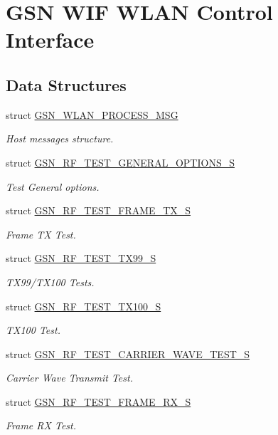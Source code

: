 \hypertarget{a00640}{
\section{GSN WIF WLAN Control Interface}
\label{a00640}
}
\subsection*{Data Structures}
\begin{DoxyCompactItemize}
\item 
struct \hyperlink{a00418}{GSN\_\-WLAN\_\-PROCESS\_\-MSG}
\begin{DoxyCompactList}\small\item\em Host messages structure. \end{DoxyCompactList}\item 
struct \hyperlink{a00188}{GSN\_\-RF\_\-TEST\_\-GENERAL\_\-OPTIONS\_\-S}
\begin{DoxyCompactList}\small\item\em Test General options. \end{DoxyCompactList}\item 
struct \hyperlink{a00187}{GSN\_\-RF\_\-TEST\_\-FRAME\_\-TX\_\-S}
\begin{DoxyCompactList}\small\item\em Frame TX Test. \end{DoxyCompactList}\item 
struct \hyperlink{a00190}{GSN\_\-RF\_\-TEST\_\-TX99\_\-S}
\begin{DoxyCompactList}\small\item\em TX99/TX100 Tests. \end{DoxyCompactList}\item 
struct \hyperlink{a00189}{GSN\_\-RF\_\-TEST\_\-TX100\_\-S}
\begin{DoxyCompactList}\small\item\em TX100 Test. \end{DoxyCompactList}\item 
struct \hyperlink{a00185}{GSN\_\-RF\_\-TEST\_\-CARRIER\_\-WAVE\_\-TEST\_\-S}
\begin{DoxyCompactList}\small\item\em Carrier Wave Transmit Test. \end{DoxyCompactList}\item 
struct \hyperlink{a00186}{GSN\_\-RF\_\-TEST\_\-FRAME\_\-RX\_\-S}
\begin{DoxyCompactList}\small\item\em Frame RX Test. \end{DoxyCompactList}\item 

\end{DoxyCompactItemize}
